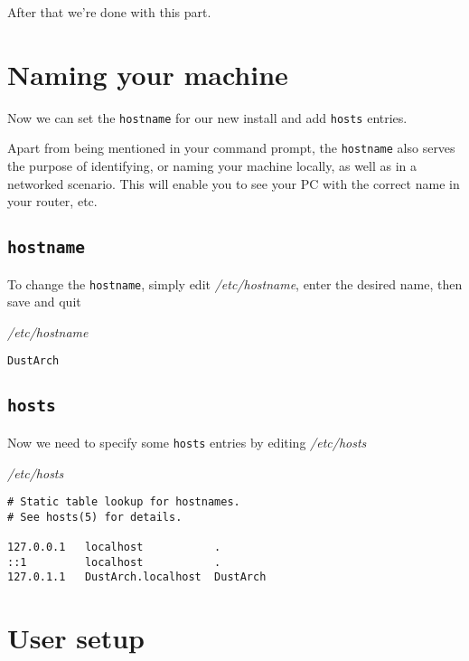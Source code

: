 \documentclass[10pt]{dustdoc}
\begin{document}
After that we’re done with this part.

\section{Naming your machine}
\label{sec:naming-your-machine}

Now we can set the \texttt{hostname} for our new install and add \texttt{hosts} entries.

Apart from being mentioned in your command prompt, the \texttt{hostname} also serves the purpose of identifying, or naming your machine locally, as well as in a networked scenario.  This will enable you to see your PC with the correct name in your router, etc.

\subsection{\texttt{hostname}}
\label{sec:hostname}

To change the \texttt{hostname}, simply edit \textit{/etc/hostname}, enter the desired name, then save and quit

\begin{mintedlisting}
    \caption*{\textit{/etc/hostname}}
    \begin{verbatim}
DustArch
    \end{verbatim}
\end{mintedlisting}

\subsection{\texttt{hosts}}
\label{sec:hosts}

Now we need to specify some \texttt{hosts} entries by editing \textit{/etc/hosts}

\begin{mintedlisting}
    \caption*{\textit{/etc/hosts}}
    \begin{verbatim}
# Static table lookup for hostnames.
# See hosts(5) for details.

127.0.0.1   localhost           .
::1         localhost           .
127.0.1.1   DustArch.localhost  DustArch
    \end{verbatim}
\end{mintedlisting}

\section{User setup}
\label{sec:user-setup}
\end{document}
